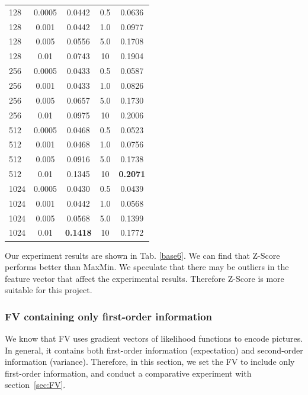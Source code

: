\documentclass[conference]{IEEEtran}
\begin{document}
\begin{table}[htbp]
\begin{tabular}{@{}p{1cm}<{\centering}|c|c|c|c}
		128   & 0.0005  & 0.0442 & 0.5 & 0.0636\\
		128   & 0.001  & 0.0442 & 1.0 & 0.0977\\
		128   & 0.005  & 0.0556 & 5.0 & 0.1708\\
		128   & 0.01  & 0.0743 & 10 & 0.1904\\
		256   & 0.0005  & 0.0433 & 0.5 & 0.0587\\
		256   & 0.001  & 0.0433 & 1.0 & 0.0826\\
		256   & 0.005  & 0.0657 & 5.0 & 0.1730\\
		256   & 0.01  & 0.0975 & 10 & 0.2006\\
		512   & 0.0005  & 0.0468 & 0.5 & 0.0523\\
		512   & 0.001  & 0.0468 & 1.0 & 0.0756\\
		512   & 0.005  & 0.0916 & 5.0 & 0.1738\\
		512   & 0.01  & 0.1345 & 10 & \textbf{0.2071}\\
		1024   & 0.0005  & 0.0430 & 0.5 & 0.0439\\
		1024   & 0.001  & 0.0442 & 1.0 & 0.0568\\
		1024   & 0.005  & 0.0568 & 5.0 & 0.1399\\
		1024   & 0.01  & \textbf{0.1418} & 10 & 0.1772\\
		\hline
	\end{tabular}
\end{table}

Our experiment results are shown in Tab. \ref{base6}. We can find that Z-Score performs better than MaxMin.
We speculate that there may be outliers in the feature vector that affect the experimental results. Therefore Z-Score is more suitable for this project.
\subsubsection{FV containing only first-order information}
We know that FV uses gradient vectors of likelihood functions to encode pictures. In general, it contains both first-order information (expectation) and second-order information (variance). Therefore, in this section, we set the FV to include only first-order information, and conduct a comparative experiment with section~\ref{sec:FV}.
\end{document}
